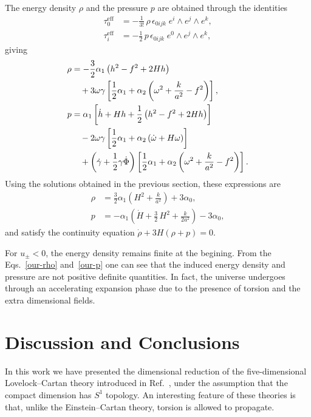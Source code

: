 \documentclass[aps,prd,12pt,superscriptaddress,showpacs,showkeys,longbibliography,reprint,nofootinbib]{revtex4-1}
\begin{document}
The energy density $\rho$ and the pressure $p$ are obtained through the identities
\begin{align}
  \tau_0^{\mathrm{eff}} &= -\frac{1}{3!} \, \rho \, \epsilon_{0ijk} \; e^i\wedge e^j\wedge e^k,\\
  \tau_i^{\mathrm{eff}} &= -\frac{1}{2} \,p \, \epsilon_{0ijk} \; e^0\wedge e^j\wedge e^k,
\end{align} 
giving
\begin{align}
  \label{rho}
  \rho &= -\frac{3}{2}\alpha_1\left(h^2-f^2+2Hh\right) \\
  & \quad + 3\omega\gamma\left[\frac{1}{2}\alpha_1+\alpha_2\left(\omega^2+\frac{k}{a^2}-f^2\right)\right], \notag
  \\
  \label{presion}
  p &= \alpha_1\left[\dot{h}+Hh+\frac{1}{2}\left(h^2-f^2+2Hh\right)\right]\\
  & \quad - 2\omega\gamma\left[\frac{1}{2}\alpha_1+\alpha_2\left(\dot{\omega}+H\omega\right)\right]\notag\\
  & \quad +\left(\dot{\gamma}+\frac{1}{2}\gamma\dot{\Phi}\right)\left[\frac{1}{2}\alpha_1+\alpha_2\left(\omega^2+\frac{k}{a^2}-f^2\right)\right]. \notag
\end{align}
Using the solutions obtained in the previous section, these expressions are
\begin{align}
  \label{our-rho}
  \rho &= \frac{3}{2}\alpha_1\left(H^2 + \frac{k}{a^2}\right) + 3\alpha_0, \\
  \label{our-p}
  p &= -\alpha_1\left(\dot{H} + \frac{3}{2}\,H^2 + \frac{k}{2a^2}\right) - 3\alpha_0,
\end{align}
and satisfy the continuity equation $\dot{\rho}+3H\left(\rho+p\right)=0$. 

For $u_\pm<0$, the energy density remains finite at the begining. From the Eqs.~\eqref{our-rho} and~\eqref{our-p} one can see that the induced energy density and pressure are not positive definite quantities. In fact, the universe undergoes through an accelerating expansion phase due to the presence of torsion and the extra dimensional fields. 


\section{Discussion and Conclusions\label{conclusions}}

In this work we have presented the dimensional reduction of the five-dimensional Lovelock--Cartan theory introduced in Ref.~\cite{Mardones:1990qc}, under the assumption that the compact dimension has $S^1$ topology. An interesting feature of these theories is that, unlike the Einstein--Cartan theory, torsion is allowed to propagate.
\end{document}
